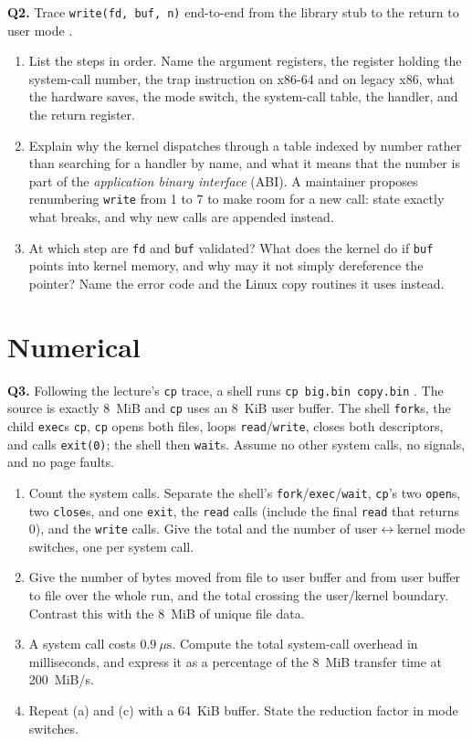 \documentclass[11pt]{article}
\begin{document}
\textbf{Q2.} Trace \texttt{write(fd, buf, n)} end-to-end from the library stub to the return to user mode \cite{BovetCesati_understanding_linux_kernel}.
\begin{enumerate}
  \item[(a)] List the steps in order. Name the argument registers, the register holding the system-call number, the trap instruction on x86-64 and on legacy x86, what the hardware saves, the mode switch, the system-call table, the handler, and the return register.
  \item[(b)] Explain why the kernel dispatches through a table indexed by number rather than searching for a handler by name, and what it means that the number is part of the \emph{application binary interface} (ABI). A maintainer proposes renumbering \texttt{write} from 1 to 7 to make room for a new call: state exactly what breaks, and why new calls are appended instead.
  \item[(c)] At which step are \texttt{fd} and \texttt{buf} validated? What does the kernel do if \texttt{buf} points into kernel memory, and why may it not simply dereference the pointer? Name the error code and the Linux copy routines it uses instead.
\end{enumerate}

\section{Numerical}

\textbf{Q3.} Following the lecture's \texttt{cp} trace, a shell runs \texttt{cp big.bin copy.bin} \cite{SilberschatzOSC_operating_system_concepts}. The source is exactly 8~MiB and \texttt{cp} uses an 8~KiB user buffer. The shell \texttt{fork}s, the child \texttt{exec}s \texttt{cp}, \texttt{cp} opens both files, loops \texttt{read}/\texttt{write}, closes both descriptors, and calls \texttt{exit(0)}; the shell then \texttt{wait}s. Assume no other system calls, no signals, and no page faults.
\begin{enumerate}
  \item[(a)] Count the system calls. Separate the shell's \texttt{fork}/\texttt{exec}/\texttt{wait}, \texttt{cp}'s two \texttt{open}s, two \texttt{close}s, and one \texttt{exit}, the \texttt{read} calls (include the final \texttt{read} that returns 0), and the \texttt{write} calls. Give the total and the number of user$\leftrightarrow$kernel mode switches, one per system call.
  \item[(b)] Give the number of bytes moved from file to user buffer and from user buffer to file over the whole run, and the total crossing the user/kernel boundary. Contrast this with the 8~MiB of unique file data.
  \item[(c)] A system call costs $0.9~\mu\text{s}$. Compute the total system-call overhead in milliseconds, and express it as a percentage of the 8~MiB transfer time at 200~MiB/s.
  \item[(d)] Repeat (a) and (c) with a 64~KiB buffer. State the reduction factor in mode switches.
\end{enumerate}
\end{document}
